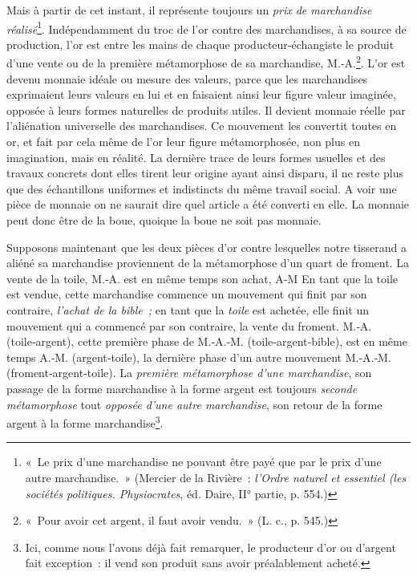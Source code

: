 \documentclass[french,twoside]{book} %
\begin{document}
Mais à partir de cet instant, il représente toujours un \emph{prix de marchandise réalisé}\footnote{« Le prix d’une marchandise ne pouvant être payé que par le prix d’une autre marchandise. » (Mercier de la Rivière : \emph{l’Ordre naturel et essentiel (les sociétés politiques. Physiocrates}, éd. Daire, II° partie, p. 554.)}. Indépendamment du troc de l’or contre des marchandises, à sa source de production, l’or est entre les mains de chaque producteur‑échangiste le produit d’une vente ou de la première métamorphose de sa marchandise, M.‑A.\footnote{« Pour avoir cet argent, il faut avoir vendu. » (L. c., p. 545.)}. L’or est devenu monnaie idéale ou mesure des valeurs, parce que les marchandises exprimaient leurs valeurs en lui et en faisaient ainsi leur figure valeur imaginée, opposée à leurs formes naturelles de produits utiles. Il devient monnaie réelle par l’aliénation universelle des marchandises. Ce mouvement les convertit toutes en or, et fait par cela même de l’or leur figure métamorphosée, non plus en imagination, mais en réalité. La dernière trace de leurs formes usuelles et des travaux concrets dont elles tirent leur origine ayant ainsi disparu, il ne reste plus que des échantillons uniformes et indistincts du même travail social. A voir une pièce de monnaie on ne saurait dire quel article a été converti en elle. La monnaie peut donc être de la boue, quoique la boue ne soit pas monnaie.\par
Supposons maintenant que les deux pièces d’or contre lesquelles notre tisserand a aliéné sa marchandise proviennent de la métamorphose d’un quart de froment. La vente de la toile, M.‑A. est en même temps son achat, A‑M En tant que la toile est vendue, cette marchandise commence un mouvement qui finit par son contraire, \emph{l’achat de la bible ;} en tant que la \emph{toile} est achetée, elle finit un mouvement qui a commencé par son contraire, la vente du froment. M.‑A. (toile‑argent), cette première phase de M.‑A.‑M. (toile‑argent‑bible), est en même temps A.‑M. (argent‑toile), la dernière phase d’un autre mouvement M.‑A.‑M. (froment‑argent‑toile). La \emph{première métamorphose d’une marchandise}, son passage de la forme marchandise à la forme argent est toujours \emph{seconde métamorphose} tout \emph{opposée d’une autre marchandise}, son retour de la forme argent à la forme marchandise\footnote{Ici, comme nous l’avons déjà fait remarquer, le producteur d’or ou d’argent fait exception : il vend son produit sans avoir préalablement acheté.}.\par
\end{document}
